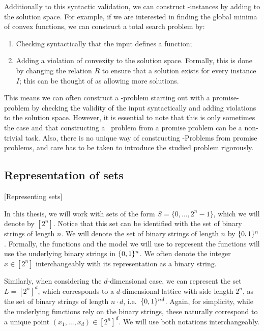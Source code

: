 Additionally to this syntactic validation, we can construct \TFNP-instances by adding  to the solution space. For example, if we are interested in finding the global minima of convex functions, we can construct a total search problem by:
\begin{enumerate}
	\item Checking syntactically that the input defines a function;
	\item Adding a violation of convexity to the solution space. Formally, this is done by changing the relation $R$ to ensure that a solution exists for every instance $I$; this can be thought of as allowing more solutions.
\end{enumerate}

This means we can often construct a \TFNP-problem starting out with a promise-problem by checking the validity of the input syntactically and adding violations to the solution space. However, it is essential to note that this is only sometimes the case and that constructing a \TFNP\ problem from a promise problem can be a non-trivial task. Also, there is no unique way of constructing \TFNP-Problems from promise problems, and care has to be taken to introduce the studied problem rigorously.

\subsection{Representation of sets}[Representing sets]

In this thesis, we will work with sets of the form $S = \{0, \dots, 2^n - 1\}$, which we will denote by $[2^n]$. Notice that this set can be identified with the set of binary strings of length $n$. We will denote the set of binary strings of length $n$ by $\{0, 1\}^n$. Formally, the functions and the model we will use to represent the functions will use the underlying binary strings in $\{0, 1\}^n$. We often denote the integer $x \in [2^n]$ interchangeably with its representation as a binary string.

Similarly, when considering the $d$-dimensional case, we can represent the set $L = [2^n]^d$, which corresponds to a $d$-dimensional lattice with side length $2^n$, as the set of binary strings of length $n \cdot d$, i.e.\ $\{0, 1\}^{nd}$. Again, for simplicity, while the underlying functions rely on the binary strings, these naturally correspond to a unique point $(x_1, \dots, x_d) \in [2^n]^d$. We will use both notations interchangeably.

